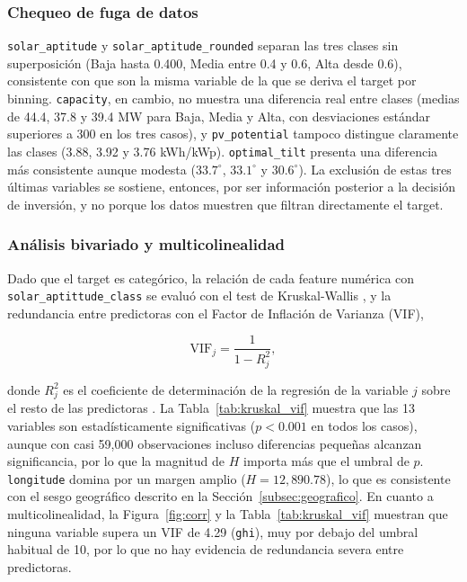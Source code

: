 \documentclass[pdflatex,sn-mathphys-num]{sn-jnl}
\begin{document}
\subsubsection{Chequeo de fuga de datos}\label{subsec:leakage}

\texttt{solar\_aptitude} y \texttt{solar\_aptitude\_rounded} separan las tres clases sin superposición (Baja hasta 0.400, Media entre 0.4 y 0.6, Alta desde 0.6), consistente con que son la misma variable de la que se deriva el target por binning. \texttt{capacity}, en cambio, no muestra una diferencia real entre clases (medias de 44.4, 37.8 y 39.4 MW para Baja, Media y Alta, con desviaciones estándar superiores a 300 en los tres casos), y \texttt{pv\_potential} tampoco distingue claramente las clases (3.88, 3.92 y 3.76 kWh/kWp). \texttt{optimal\_tilt} presenta una diferencia más consistente aunque modesta ($33.7^\circ$, $33.1^\circ$ y $30.6^\circ$). La exclusión de estas tres últimas variables se sostiene, entonces, por ser información posterior a la decisión de inversión, y no porque los datos muestren que filtran directamente el target.

\subsubsection{Análisis bivariado y multicolinealidad}\label{subsec:bivariado}

Dado que el target es categórico, la relación de cada feature numérica con \texttt{solar\_aptittude\_class} se evaluó con el test de Kruskal-Wallis \cite{bib4}, y la redundancia entre predictoras con el Factor de Inflación de Varianza (VIF),

\begin{equation}
\mathrm{VIF}_j = \frac{1}{1 - R_j^2},
\label{eq:vif}
\end{equation}

\noindent donde $R_j^2$ es el coeficiente de determinación de la regresión de la variable $j$ sobre el resto de las predictoras \cite{bib5}. La Tabla~\ref{tab:kruskal_vif} muestra que las 13 variables son estadísticamente significativas ($p<0.001$ en todos los casos), aunque con casi 59{,}000 observaciones incluso diferencias pequeñas alcanzan significancia, por lo que la magnitud de $H$ importa más que el umbral de $p$. \texttt{longitude} domina por un margen amplio ($H=12{,}890.78$), lo que es consistente con el sesgo geográfico descrito en la Sección~\ref{subsec:geografico}. En cuanto a multicolinealidad, la Figura~\ref{fig:corr} y la Tabla~\ref{tab:kruskal_vif} muestran que ninguna variable supera un VIF de 4.29 (\texttt{ghi}), muy por debajo del umbral habitual de 10, por lo que no hay evidencia de redundancia severa entre predictoras.
\end{document}
